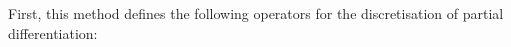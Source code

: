 \documentclass[12pt]{article}
\begin{document}
First, this method defines the following operators for the discretisation of partial differentiation:



\end{document}
